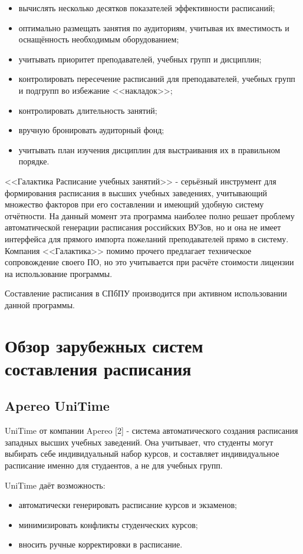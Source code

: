 \begin{itemize}
	\item вычислять несколько десятков показателей эффективности расписаний;
	\item оптимально размещать занятия по аудиториям, учитывая их вместимость и оснащённость необходимым оборудованием;
	\item учитывать приоритет преподавателей, учебных групп и дисциплин;
	\item контролировать пересечение расписаний для преподавателей, учебных групп и подгрупп во избежание <<накладок>>;
	\item контролировать длительность занятий;
	\item вручную бронировать аудиторный фонд;
	\item учитывать план изучения дисциплин для выстраивания их в правильном порядке.
\end{itemize}

<<Галактика Расписание учебных занятий>> - серьёзный инструмент для формирования расписания в высших учебных заведениях, учитывающий множество факторов при его составлении и имеющий удобную систему отчётности. На данный момент эта программа наиболее полно решает проблему автоматической генерации расписания российских ВУЗов, но и она не имеет интерфейса для прямого импорта пожеланий преподавателей прямо в систему. Компания <<Галактика>> помимо прочего предлагает техническое сопровождение своего ПО, но это учитывается при расчёте стоимости лицензии на использование программы.

Составление расписания в СПбПУ производится при активном использовании данной программы.

\section{Обзор зарубежных систем составления расписания} \label{ch1:sec3}	

\subsection {Apereo UniTime}
UniTime от компании Apereo [2] - система автоматического создания расписания западных высших учебных заведений. Она учитывает, что студенты могут выбирать себе индивидуальный набор курсов, и составляет индивидуальное расписание именно для студаентов, а не для учебных групп. 

UniTime даёт возможность:
\begin{itemize}
	\item автоматически генерировать расписание курсов и экзаменов;
	\item минимизировать конфликты студенческих курсов;
	\item вносить ручные корректировки в расписание.
\end{itemize}

